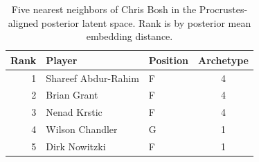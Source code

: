 \begin{table}[htbp]
  \centering\small
  \begin{tabular}{rllc}
    \toprule
    Rank & Player & Position & Archetype \\
    \midrule
    1 & Shareef Abdur-Rahim & F & 4 \\
    2 & Brian Grant & F & 4 \\
    3 & Nenad Krstic & F & 4 \\
    4 & Wilson Chandler & G & 1 \\
    5 & Dirk Nowitzki & F & 1 \\
    \bottomrule
  \end{tabular}
  \caption{Five nearest neighbors of Chris Bosh in the Procrustes-aligned posterior latent space. Rank is by posterior mean embedding distance.}
  \label{tab:Chris_Bosh_neighbors}
\end{table}

